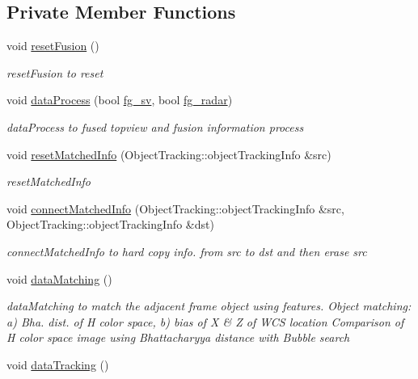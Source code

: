 \subsection*{Private Member Functions}
\begin{DoxyCompactItemize}
\item 
void \hyperlink{class_sensor_info_a3ed48f9d9d629f385b26cc490e33950f}{reset\+Fusion} ()
\begin{DoxyCompactList}\small\item\em reset\+Fusion to reset \end{DoxyCompactList}\item 
void \hyperlink{class_sensor_info_a6b51dff8a9c8f958bd883d882afc6efb}{data\+Process} (bool \hyperlink{class_sensor_info_a207a7b13dd2fe49ca4a5cd7f5c183004}{fg\+\_\+sv}, bool \hyperlink{class_sensor_info_aa526e31c8b20b439088564a9b2bb86e9}{fg\+\_\+radar})
\begin{DoxyCompactList}\small\item\em data\+Process to fused topview and fusion information process \end{DoxyCompactList}\item 
void \hyperlink{class_sensor_info_a9916b2b7cd6af21de4ee6654be72bf6e}{reset\+Matched\+Info} (Object\+Tracking\+::object\+Tracking\+Info \&src)
\begin{DoxyCompactList}\small\item\em reset\+Matched\+Info \end{DoxyCompactList}\item 
void \hyperlink{class_sensor_info_aec57ab5b262ee80c9c257e7c216e07dc}{connect\+Matched\+Info} (Object\+Tracking\+::object\+Tracking\+Info \&src, Object\+Tracking\+::object\+Tracking\+Info \&dst)
\begin{DoxyCompactList}\small\item\em connect\+Matched\+Info to hard copy info. from src to dst and then erase src \end{DoxyCompactList}\item 
\hypertarget{class_sensor_info_ad226b2e50d1e7a871ffc43f3a28fe85a}{}void \hyperlink{class_sensor_info_ad226b2e50d1e7a871ffc43f3a28fe85a}{data\+Matching} ()\label{class_sensor_info_ad226b2e50d1e7a871ffc43f3a28fe85a}

\begin{DoxyCompactList}\small\item\em data\+Matching to match the adjacent frame object using features. Object matching\+: a) Bha. dist. of H color space, b) bias of X \& Z of W\+C\+S location Comparison of H color space image using Bhattacharyya distance with Bubble search \end{DoxyCompactList}\item 
\hypertarget{class_sensor_info_a3636d05f03ced4e9256eb9fb0fe25561}{}void \hyperlink{class_sensor_info_a3636d05f03ced4e9256eb9fb0fe25561}{data\+Tracking} ()\label{class_sensor_info_a3636d05f03ced4e9256eb9fb0fe25561}


\end{DoxyCompactItemize}
